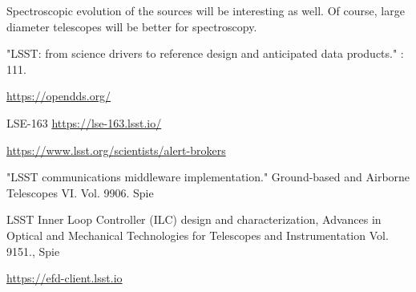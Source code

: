 \documentclass[proceedings, preprint]{rmaa}
\begin{document}
Spectroscopic evolution of the sources will be interesting as well. Of course,
large diameter telescopes will be better for spectroscopy.

\begin{thebibliography}
   "LSST: from science drivers to reference design and anticipated data products." : 111.

  \url{https://opendds.org/}

  LSE-163 \url{https://lse-163.lsst.io/}

  \url{https://www.lsst.org/scientists/alert-brokers}

  "LSST communications middleware implementation." Ground-based and Airborne Telescopes VI. Vol. 9906. Spie

  LSST Inner Loop Controller (ILC) design and characterization, Advances in Optical and Mechanical Technologies for Telescopes and Instrumentation Vol. 9151., Spie

  \url{https://efd-client.lsst.io}

\end{thebibliography}
\end{document}
